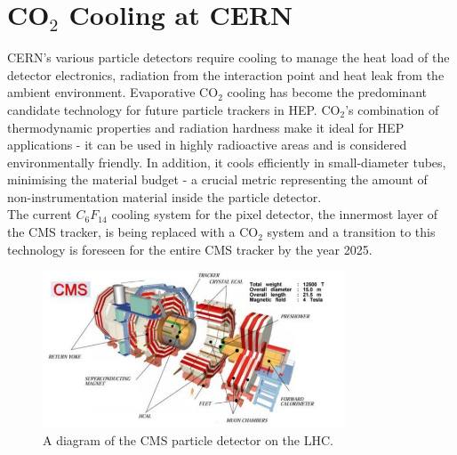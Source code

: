 \documentclass{report}
\begin{document}
\section{CO\texorpdfstring{$_2$}{TEXT} Cooling at CERN}
CERN's various particle detectors require cooling to manage the heat load of the detector electronics, radiation from the interaction point and heat leak from the ambient environment. Evaporative CO$_2$ cooling has become the predominant candidate technology for future particle trackers in HEP.\cite{mishra} CO$_2$'s combination of thermodynamic properties and radiation hardness make it ideal for HEP applications - it can be used in highly radioactive areas and is considered environmentally friendly. In addition, it cools efficiently in small-diameter tubes, minimising the material budget - a crucial metric representing the amount of non-instrumentation material inside the particle detector. \cite{jerome} \\The current $C_6F_{14}$ cooling system for the pixel detector, the innermost layer of the CMS tracker, is  being replaced with a CO$_2$ system and a transition to this technology is foreseen for the entire CMS tracker by the year 2025.
\FloatBarrier
\begin{figure}
\centering
\includegraphics[width=0.8\textwidth]{figures/CMS.jpg}
\caption{A diagram of the CMS particle detector on the LHC. \cite{mishra}}
\label{fig: cms}
\end{figure}	
\FloatBarrier
\end{document}
